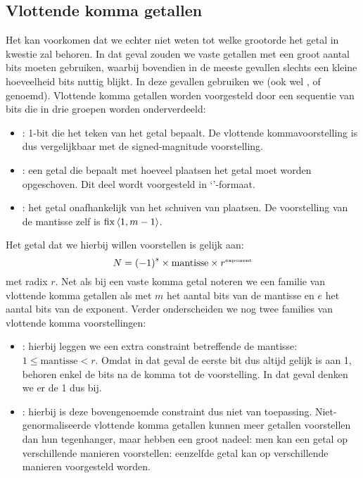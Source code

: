 \subsection{Vlottende komma getallen}
\label{ss:floatingPoints}
Het kan voorkomen dat we echter niet weten tot welke grootorde het getal in kwestie zal behoren. In dat geval zouden we vaste getallen met een groot aantal bits moeten gebruiken, waarbij bovendien in de meeste gevallen slechts een kleine hoeveelheid bits nuttig blijkt. In deze gevallen gebruiken we  (ook wel ,  of  genoemd). Vlottende komma getallen worden voorgesteld door een sequentie van bits die in drie groepen worden onderverdeeld:
\begin{itemize}
 \item {}: 1-bit die het teken van het getal bepaalt. De vlottende kommavoorstelling is dus vergelijkbaar met de signed-magnitude voorstelling.
 \item {}: een getal die bepaalt met hoeveel plaatsen het getal moet worden opgeschoven. Dit deel wordt voorgesteld in `'-formaat.
 \item {}: het getal onafhankelijk van het schuiven van plaatsen. De voorstelling van de mantisse zelf is $\operatorname{fix}\left<1,m-1\right>$.
\end{itemize}
Het getal dat we hierbij willen voorstellen is gelijk aan:
\begin{equation}
N=\left(-1\right)^s\times\mbox{mantisse}\times r^{\mbox{\tiny{exponent}}}
\end{equation}
met radix $r$. Net als bij een vaste komma getal noteren we een familie van vlottende komma getallen als  met $m$ het aantal bits van de mantisse en $e$ het aantal bits van de exponent. Verder onderscheiden we nog twee families van vlottende komma voorstellingen:
\begin{itemize}
 \item {}: hierbij leggen we een extra constraint betreffende de mantisse: $1\leq\mbox{mantisse}<r$. Omdat in dat geval de eerste bit dus altijd gelijk is aan 1, behoren enkel de bits na de komma tot de voorstelling. In dat geval denken we er de 1 dus bij.
 \item {}: hierbij is deze bovengenoemde constraint dus niet van toepassing. Niet-genormaliseerde vlottende komma getallen kunnen meer getallen voorstellen dan hun tegenhanger, maar hebben een groot nadeel: men kan een getal op verschillende manieren voorstellen: eenzelfde getal kan op verschillende manieren voorgesteld worden.
\end{itemize}
